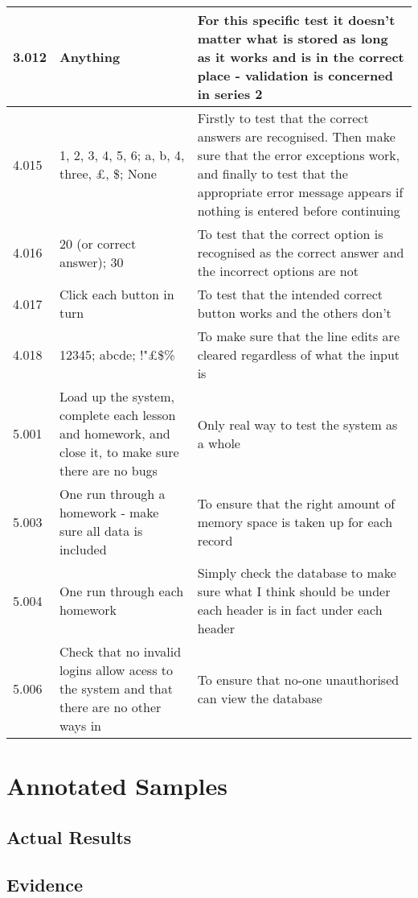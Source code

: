 \begin{landscape}
\begin{center}
\begin{longtable}{|p{4cm}|p{4cm}|p{5cm}|}
3.012 & Anything & For this specific test it doesn't matter what is stored as long as it works and is in the correct place - validation is concerned in series 2 \\ \hline
4.015 & 1, 2, 3, 4, 5, 6; a, b, 4, three, £, \$; None & Firstly to test that the correct answers are recognised. Then make sure that the error exceptions work, and finally to test that the appropriate error message appears if nothing is entered before continuing \\ \hline
4.016 & 20 (or correct answer); 30 & To test that the correct option is recognised as the correct answer and the incorrect options are not \\ \hline
4.017 & Click each button in turn & To test that the intended correct button works and the others don't \\ \hline
4.018 & 12345; abcde; !"£\$\% & To make sure that the line edits are cleared regardless of what the input is \\ \hline
5.001 & Load up the system, complete each lesson and homework, and close it, to make sure there are no bugs & Only real way to test the system as a whole \\ \hline
5.003 & One run through a homework - make sure all data is included & To ensure that the right amount of memory space is taken up for each record \\ \hline
5.004 & One run through each homework & Simply check the database to make sure what I think should be under each header is in fact under each header \\ \hline
5.006 & Check that no invalid logins allow acess to the system and that there are no other ways in & To ensure that no-one unauthorised can view the database \\ \hline
\end{longtable}
\end{center}

\section{Annotated Samples}

\subsection{Actual Results}

\subsection{Evidence}

\end{landscape}

